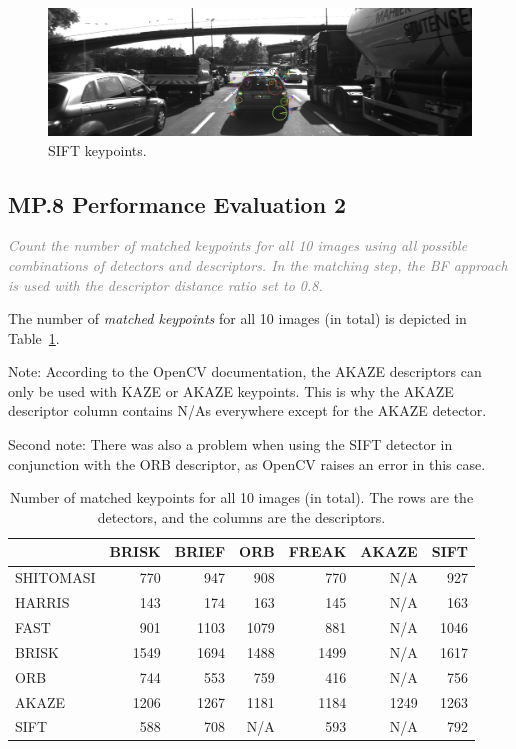 \documentclass[a4paper]{scrartcl}
\begin{document}
\begin{figure}
	\centering
	\includegraphics[width=0.8\columnwidth]{./keypoints/SIFT}
	\caption{SIFT keypoints.}
	\label{fig:sift_keypoints}
\end{figure}

\subsection*{MP.8 Performance Evaluation 2}
\textcolor{gray}{\textit{Count the number of matched keypoints for all 10 images using all possible combinations of detectors and descriptors. In the matching step, the BF approach is used with the descriptor distance ratio set to 0.8.}}

The number of \emph{matched keypoints} for all 10 images (in total)
is depicted in Table~\ref{tab:performance_2}.

Note: According to the OpenCV documentation,
the AKAZE descriptors can only be used with KAZE or AKAZE keypoints.
This is why the AKAZE descriptor column contains N/As everywhere except
for the AKAZE detector.

Second note: There was also a problem when using the SIFT detector
in conjunction with the ORB descriptor, as OpenCV raises an error in this case.


\begin{table}
	\caption{Number of matched keypoints for all 10 images (in total).
		The rows are the detectors, and the columns are the descriptors.}
	\label{tab:performance_2}
	\begin{tabular}{l||r|r|r|r|r|r}
		 			& BRISK & BRIEF & ORB & FREAK & AKAZE & SIFT	\\
		\hline \hline
		SHITOMASI 	& 770 & 947 & 908 & 770 & N/A & 927 \\
		HARRIS 		& 143 & 174 & 163 & 145 & N/A & 163 \\
		FAST 		& 901 & 1103 & 1079 & 881 & N/A & 1046 \\
		BRISK 		& 1549 & 1694 & 1488 & 1499 & N/A & 1617 \\
		ORB 			& 744 & 553 & 759 & 416 & N/A & 756 \\
		AKAZE 		& 1206 & 1267 & 1181 & 1184 & 1249 & 1263 \\
		SIFT 		& 588 & 708 & N/A & 593 & N/A & 792 \\
		\hline
	\end{tabular}
\end{table}
\end{document}
